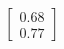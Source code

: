 \documentclass[preview]{standalone}
\begin{document}
\begin{align*}
\begin{bmatrix} 0.68 \\ 0.77 \end{bmatrix}
\end{align*}
\end{document}
